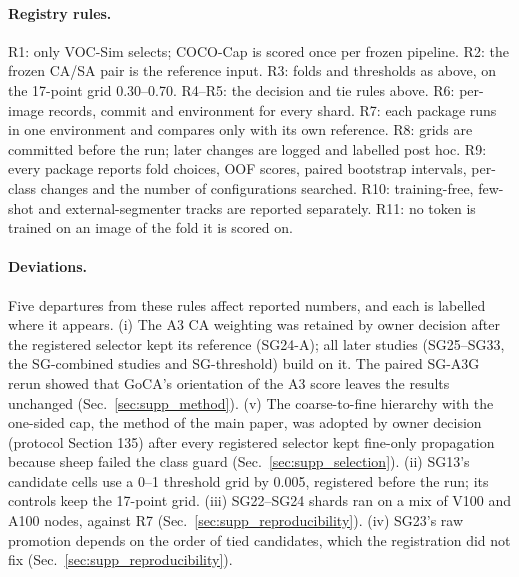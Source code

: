 \paragraph{Registry rules.}
R1: only VOC-Sim selects; COCO-Cap is scored once per frozen pipeline. R2: the frozen CA/SA pair is the reference input. R3: folds and thresholds as above, on the 17-point grid 0.30--0.70. R4--R5: the decision and tie rules above. R6: per-image records, commit and environment for every shard. R7: each package runs in one environment and compares only with its own reference. R8: grids are committed before the run; later changes are logged and labelled post hoc. R9: every package reports fold choices, OOF scores, paired bootstrap intervals, per-class changes and the number of configurations searched. R10: training-free, few-shot and external-segmenter tracks are reported separately. R11: no token is trained on an image of the fold it is scored on.

\paragraph{Deviations.}
Five departures from these rules affect reported numbers, and each is labelled where it appears. (i) The A3 CA weighting was retained by owner decision after the registered selector kept its reference (SG24-A); all later studies (SG25--SG33, the SG-combined studies and SG-threshold) build on it. The paired SG-A3G rerun showed that GoCA's orientation of the A3 score leaves the results unchanged (Sec.~\ref{sec:supp_method}). (v) The coarse-to-fine hierarchy with the one-sided cap, the method of the main paper, was adopted by owner decision (protocol Section 135) after every registered selector kept fine-only propagation because sheep failed the class guard (Sec.~\ref{sec:supp_selection}). (ii) SG13's candidate cells use a 0--1 threshold grid by 0.005, registered before the run; its controls keep the 17-point grid. (iii) SG22--SG24 shards ran on a mix of V100 and A100 nodes, against R7 (Sec.~\ref{sec:supp_reproducibility}). (iv) SG23's raw promotion depends on the order of tied candidates, which the registration did not fix (Sec.~\ref{sec:supp_reproducibility}).
